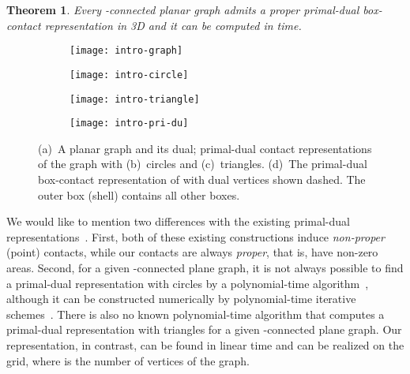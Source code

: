 \documentclass{article}
\newtheorem{theorem}{Theorem}
\newcommand{\wormhole}[1]
{
\newcounter{#1}
\setcounter{#1}{\value{theorem}}
}
\newcommand{\df}{\textit}
\begin{document}
\wormhole{thm-box}
\begin{theorem}
\label{thm:box}
Every -connected planar graph  admits a proper primal-dual box-contact
representation in 3D and it can be computed in  time.
\end{theorem}

\begin{figure}[t]
\begin{subfigure}[t]{.2\textwidth}
    \centering
    \texttt{[image: intro-graph]}
    \caption{}
  \end{subfigure}
  \hfill
  \begin{subfigure}[t]{.22\textwidth}
    \centering
    \texttt{[image: intro-circle]}
    \caption{}
    \label{fig:intro2}
  \end{subfigure}
  \hfill
  \begin{subfigure}[t]{.22\textwidth}
    \centering
    \texttt{[image: intro-triangle]}
    \caption{}
  \end{subfigure}
  \hfill
  \begin{subfigure}[t]{.3\textwidth}
    \centering
    \texttt{[image: intro-pri-du]}
    \caption{}
    \label{fig:intro4}
  \end{subfigure}
    \caption{(a)~A planar graph  and its dual; primal-dual contact representations
     of the graph with (b)~circles and (c)~triangles. (d)~The primal-dual box-contact representation of 
     with dual vertices shown dashed. The outer box (shell) contains all other boxes.}
    \label{fig:intro}
\end{figure}

We would like to mention two differences with the existing primal-dual
 representations~\cite{And70,GLP12}. First, both of these existing constructions induce \df{non-proper} (point)
 contacts, while our contacts are always \df{proper}, that is, have non-zero areas.
Second, for a given -connected plane graph, it is not always possible to find a primal-dual
 representation with circles by a polynomial-time algorithm~\cite{BDEG14}, although it can be
 constructed numerically by polynomial-time iterative schemes~\cite{CS03,Moh97}.
There is also no known polynomial-time algorithm that computes a primal-dual representation
 with triangles for a given -connected plane graph.
Our representation, in contrast, can be found in linear time and can be
realized on the  grid, where  is the number of vertices of the graph.
\end{document}
